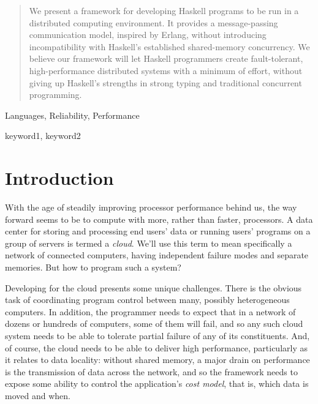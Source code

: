 \documentclass[preprint]{sigplanconf}
\begin{document}
\maketitle

\begin{abstract}
We present a framework for developing Haskell programs to be run in a distributed computing environment. It provides a message-passing communication model, inspired by Erlang, without introducing incompatibility with Haskell's established shared-memory concurrency. We believe our framework will let Haskell programmers create fault-tolerant, high-performance distributed systems with a minimum of effort, without giving up Haskell's strengths in strong typing and traditional concurrent programming.

\end{abstract}


\terms
Languages, Reliability, Performance

\keywords
keyword1, keyword2

\section{Introduction}

With the age of steadily improving processor performance behind us, the way forward seems to be to compute with more, rather than faster, processors. A data center for storing and processing end users' data or running users' programs on a  group of servers is termed a {\em cloud}. We'll use this term to mean specifically a network of connected computers, having independent failure modes and separate memories. But how to program such a system?

Developing for the cloud presents some unique challenges. There is the obvious task of coordinating program control between many, possibly heterogeneous computers. In addition, the programmer needs to expect that in a network of dozens or hundreds of computers, some of them will fail, and so any such cloud system needs to be able to tolerate partial failure of any of its constituents. And, of course, the cloud needs to be able to deliver high performance, particularly as it relates to data locality: without shared memory, a major drain on performance is the transmission of data across the network, and so the framework needs to expose some ability to control the application's {\em cost model}, that is, which data is moved and when.
\end{document}
